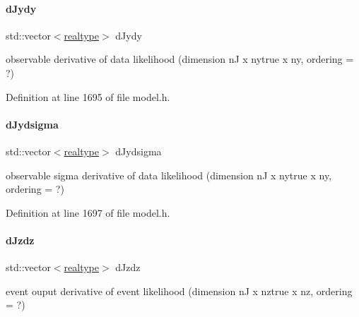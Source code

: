 \mbox{\label{classamici_1_1_model_a3ac4a9286766476c57fba8edbb2da345}} 
\paragraph{\texorpdfstring{d\+Jydy}{dJydy}}
{\footnotesize\ttfamily std\+::vector$<$\mbox{\hyperlink{namespaceamici_a1bdce28051d6a53868f7ccbf5f2c14a3}{realtype}}$>$ d\+Jydy\hspace{0.3cm}{\ttfamily [protected]}}

observable derivative of data likelihood (dimension nJ x nytrue x ny, ordering = ?) 

Definition at line 1695 of file model.\+h.

\mbox{\label{classamici_1_1_model_a32c9ff2e3e5e1fa69bd54ca0ceb41876}} 
\paragraph{\texorpdfstring{d\+Jydsigma}{dJydsigma}}
{\footnotesize\ttfamily std\+::vector$<$\mbox{\hyperlink{namespaceamici_a1bdce28051d6a53868f7ccbf5f2c14a3}{realtype}}$>$ d\+Jydsigma\hspace{0.3cm}{\ttfamily [protected]}}

observable sigma derivative of data likelihood (dimension nJ x nytrue x ny, ordering = ?) 

Definition at line 1697 of file model.\+h.

\mbox{\label{classamici_1_1_model_a6f9b92825da48e6a4b879a31670626f9}} 
\paragraph{\texorpdfstring{d\+Jzdz}{dJzdz}}
{\footnotesize\ttfamily std\+::vector$<$\mbox{\hyperlink{namespaceamici_a1bdce28051d6a53868f7ccbf5f2c14a3}{realtype}}$>$ d\+Jzdz\hspace{0.3cm}{\ttfamily [protected]}}

event ouput derivative of event likelihood (dimension nJ x nztrue x nz, ordering = ?) 


